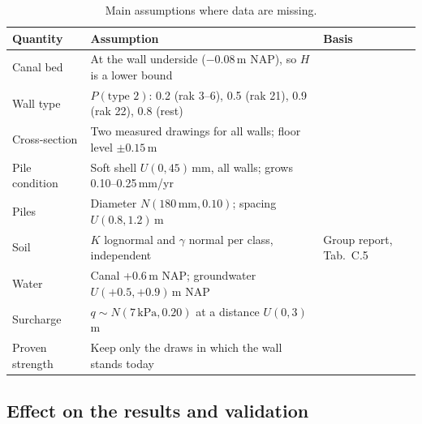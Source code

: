 \begin{table}[htbp]
\centering
\small
\caption{Main assumptions where data are missing.}
\label{tab:assumptions}
\begin{tabularx}{\textwidth}{@{}l X l@{}}
\toprule
Quantity & Assumption & Basis \\
\midrule
Canal bed & At the wall underside ($-0.08$\,m NAP), so $H$ is a lower bound & \cite{erfgoed158} \\
Wall type & $P(\text{type 2})$: 0.2 (rak 3--6), 0.5 (rak 21), 0.9 (rak 22), 0.8 (rest) & \cite{tno2009,erfgoed156} \\
Cross-section & Two measured drawings for all walls; floor level $\pm0.15$\,m & \cite{erfgoed156,ibu2010} \\
Pile condition & Soft shell $U(0,45)$\,mm, all walls; grows 0.10--0.25\,mm/yr & \cite{hemel2023} \\
Piles & Diameter $N(180\,\text{mm}, 0.10)$; spacing $U(0.8, 1.2)$\,m & \cite{ibu2010,hemel2023} \\
Soil & $K$ lognormal and $\gamma$ normal per class, independent & Group report, Tab.~C.5 \\
Water & Canal +0.6\,m NAP; groundwater $U(+0.5, +0.9)$\,m NAP & \cite{erfgoed158} \\
Surcharge & $q \sim N(7\,\text{kPa}, 0.20)$ at a distance $U(0,3)$\,m & \cite{hemel2024} \\
Proven strength & Keep only the draws in which the wall stands today & \cite{hemel2024} \\
\bottomrule
\end{tabularx}
\end{table}

\subsection{Effect on the results and validation}\label{sec:data-effect}

